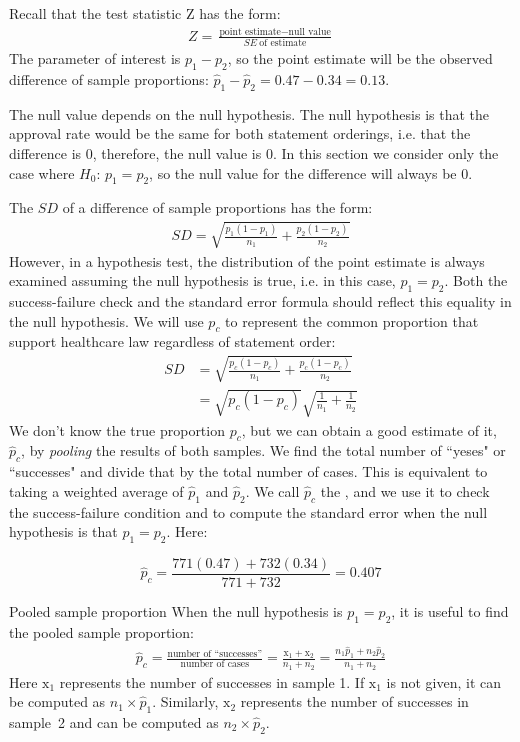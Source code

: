 Recall that the test statistic Z has the form:
\begin{align*}
Z = \frac{\text{point estimate} - \text{null value}}{SE\ \text{of estimate}}
\end{align*}
The parameter of interest is $p_1-p_2$, so the point estimate will be the observed difference of sample proportions:  $\hat{p}_{1} - \hat{p}_{2} = 0.47 - 0.34 = 0.13$.  

The null value depends on the null hypothesis.  The null hypothesis is that the approval rate would be the same for both statement orderings, i.e. that the difference is 0, therefore, the null value is 0.  In this section we consider only the case where $H_0$: $p_1=p_2$, so the null value for the difference will always be 0.

The $SD$ of a difference of sample proportions has the form:
\begin{align*}
SD = \sqrt{\frac{p_1(1-p_1)}{n_1} + \frac{p_2(1-p_2)}{n_2}}
\end{align*}
However, in a hypothesis test, the distribution of the point estimate is always examined assuming the null hypothesis is true, i.e. in this case, $p_1 = p_2$. Both the success-failure check and the standard error formula should reflect this equality in the null hypothesis. We will use $p_c$ to represent the common proportion that support healthcare law regardless of statement order:
\begin{align*}
SD &= \sqrt{\frac{p_c(1-p_c)}{n_1} + \frac{p_c(1-p_c)}{n_2}} \\
	&= \sqrt{p_c(1-p_c)}\sqrt{\frac{1}{n_1} + \frac{1}{n_2}}
\end{align*}
We don't know the true proportion $p_c$, but we can obtain a good estimate of it, $\hat{p}_c$, by \emph{pooling} the results of both samples.  We find the total number of ``yeses" or ``successes" and divide that by the total number of cases.  This is equivalent to taking a weighted average of $\hat{p}_1$ and $\hat{p}_2$.  We call $\hat{p}_c$ the , and we use it to check the success-failure condition and to compute the standard error when the null hypothesis is that $p_1 = p_2$.  Here:

$$\hat{p}_c =  \frac{771(0.47) + 732(0.34)}{771+732}= 0.407$$

\begin{onebox}{Pooled sample proportion}
When the null hypothesis is $p_1 = p_2$, it is useful to find the pooled sample proportion:
\begin{eqnarray*}
\hat{p}_c = \frac{\text{number of ``successes''}}{\text{number of cases}} = \frac{\text{x}_1+\text{x}_2}{n_1+n_2}=\frac{n_1\hat{p}_1 + n_2\hat{p}_2}{n_1 + n_2}
\end{eqnarray*}
Here $\text{x}_1$ represents the number of successes in sample 1. If $\text{x}_1$ is not given, it can be computed as $n_1\times \hat{p}_1$. Similarly, $\text{x}_2$ represents the number of successes in sample~2 and can be computed as $n_2\times \hat{p}_2$.
\end{onebox}

